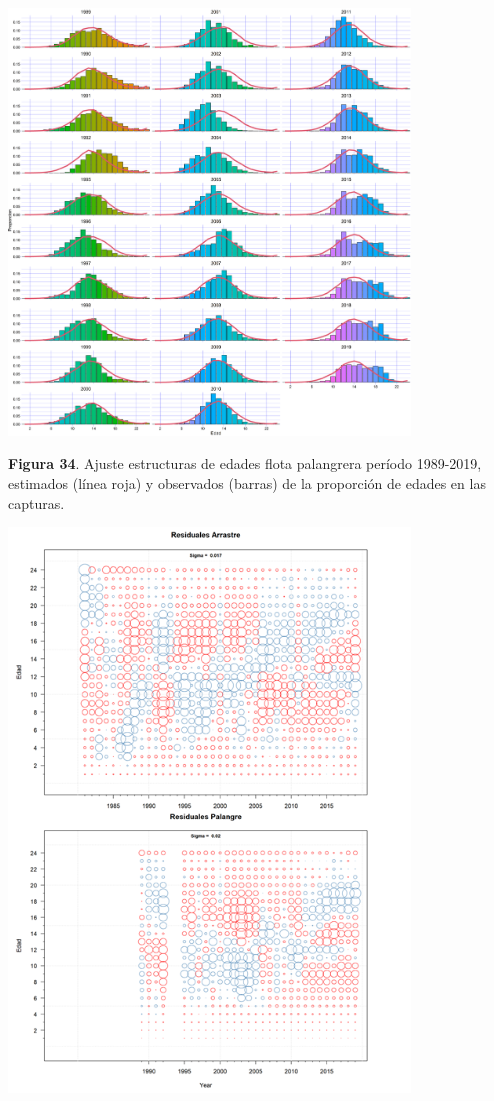 \documentclass[
  spanish,
]{article}
\begin{document}
\begin{center}
\includegraphics[width=0.8\textwidth]{Figuras/FitAgeLongline.png}
\end{center}

\small \textbf{Figura 34}. Ajuste estructuras de edades flota palangrera
período 1989-2019, estimados (línea roja) y observados (barras) de la
proporción de edades en las capturas. \vspace{0.5cm} \normalsize

\begin{center}
\includegraphics[width=0.8\textwidth]{Figuras/Figura_35.png}
\end{center}
\end{document}
